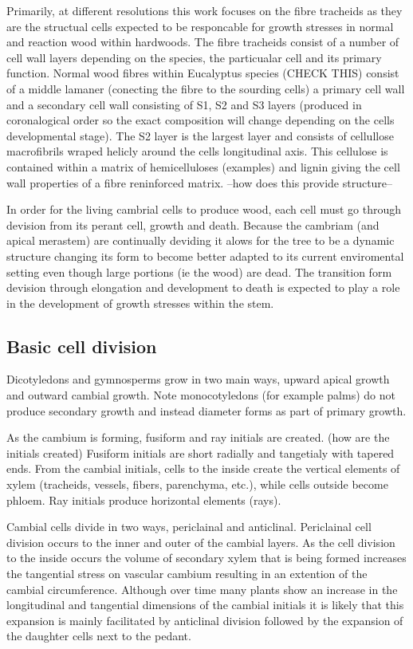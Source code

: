 \documentclass{article}
\begin{document}
Primarily, at different resolutions this work focuses on the fibre tracheids as
they are the structual cells expected to be responcable for growth stresses in
normal and reaction wood within hardwoods. The fibre tracheids consist of a
number of cell wall layers depending on the species, the particualar cell and
its primary function. Normal wood fibres within Eucalyptus species (CHECK THIS)
consist of a middle lamaner (conecting the fibre to the sourding cells) a
primary cell wall and a secondary cell wall consisting of S1, S2 and S3 layers
(produced in coronalogical order so the exact composition will change depending
on the cells developmental stage). The S2 layer is the largest layer and
consists of cellullose macrofibrils wraped helicly around the cells longitudinal
axis. This cellulose is contained within a matrix of hemicelluloses (examples)
and lignin giving the cell wall properties of a fibre reninforced matrix. --how
does this provide structure--

In order for the living cambrial cells to produce wood, each cell must go
through devision from its perant cell, growth and death. Because the
cambriam (and apical merastem) are continually deviding it alows for the tree to be a dynamic
structure changing its form to become better adapted to its current enviromental
setting even though large portions (ie the wood) are dead. The transition form
devision through elongation and development to death is expected to play a role
in the development of growth stresses within the stem.

\subsection{Basic cell division}
Dicotyledons and gymnosperms grow in two main ways, upward apical growth and
outward cambial growth. Note monocotyledons (for example palms) do not produce
secondary growth and instead diameter forms as part of primary growth.

As the cambium is forming, fusiform and ray initials are created.
(how are the initials created)
Fusiform initials are short radially and tangetialy with tapered
ends. From the cambial initials, cells to the inside create the vertical
elements of xylem (tracheids, vessels, fibers, parenchyma, etc.), while cells outside become phloem.
Ray initials produce horizontal elements (rays).

Cambial cells divide in two ways, periclainal and anticlinal.
Periclainal cell division occurs to the inner and outer of the cambial layers.
As the cell division to the inside occurs the volume of secondary xylem that is being
formed increases the tangential stress on vascular cambium resulting in an
extention of the cambial circumference. Although over time many plants show an
increase in the longitudinal and tangential dimensions of the cambial initials it is
likely that this expansion is mainly facilitated by anticlinal division followed
by the expansion of the daughter cells next to the pedant.
\end{document}
